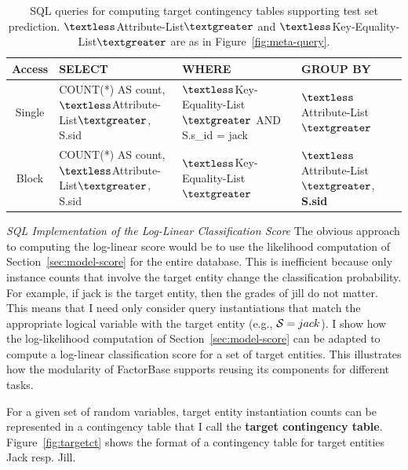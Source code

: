 \documentclass{sfuthesis}
\begin{document}
\begin{table}[!h]
\caption{SQL queries for computing target contingency tables supporting test set prediction.  $\textless$Attribute-List$\textgreater$ and  $\textless$Key-Equality-List$\textgreater$ are as in Figure~\ref{fig:meta-query}.}
\begin{center}
\begin{tabular}{|c|p{5cm}|p{4cm}|p{3cm}}
Access &SELECT&WHERE&GROUP BY\\\hline
Single &COUNT(*) AS count, $\textless$Attribute-List$\textgreater$, S.sid& $\textless$Key-Equality-List$\textgreater$ AND S.s\_id = jack&  $\textless$Attribute-List$\textgreater$\\
\hline
Block & COUNT(*) AS count,  $\textless$Attribute-List$\textgreater$, S.sid& $\textless$Key-Equality-List$\textgreater$ &  $\textless$Attribute-List$\textgreater$, \textbf{S.sid}\\
\end{tabular}
\end{center}
\label{table:target-query}
\end{table}%

{\em SQL Implementation of the Log-Linear Classification Score} 
The obvious approach to computing the log-linear score would be to use the likelihood computation of Section~\ref{sec:model-score} for the entire database.
This is inefficient because only instance counts that involve the target entity change the classification probability. 
For example, if jack is the target entity, then the grades of jill do not matter. 
This means that I  need only consider query instantiations that match the appropriate logical variable with the target entity (e.g., $\S = jack$). 
I  show how the log-likelihood computation of Section~\ref{sec:model-score} can be adapted to compute a log-linear classification score for a set of target entities. This illustrates how the modularity of FactorBase  supports reusing its components for different tasks. 

For a given set of random variables, target entity instantiation counts can be represented in a contingency table that I  call the \textbf{target contingency table}. Figure~\ref{fig:targetct} shows the format of a contingency table for target entities Jack resp. Jill.
\end{document}
